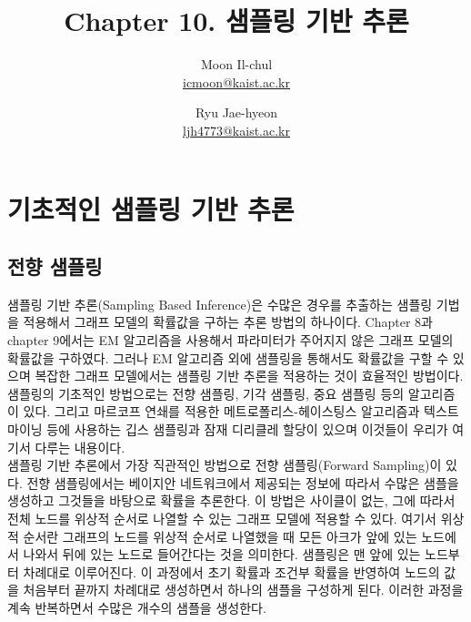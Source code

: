 \documentclass[a4paper]{oblivoir}
\author{Moon Il-chul \\ \href{mailto:icmoon@kaist.ac.kr}{icmoon@kaist.ac.kr} 
   \and Ryu Jae-hyeon
 \\ \href{mailto:ljh4773@kaist.ac.kr}{ljh4773@kaist.ac.kr} }
\title{Chapter 10. 샘플링 기반 추론}
\begin{document}
\maketitle
\tableofcontents

\section{기초적인 샘플링 기반 추론}

\subsection{전향 샘플링}

샘플링 기반 추론(Sampling Based Inference)은 수많은 경우를 추출하는 샘플링 기법을 적용해서 그래프 모델의 확률값을 구하는 추론 방법의 하나이다. Chapter 8과 chapter 9에서는 EM 알고리즘을 사용해서 파라미터가 주어지지 않은 그래프 모델의 확률값을 구하였다. 그러나 EM 알고리즘 외에 샘플링을 통해서도 확률값을 구할 수 있으며 복잡한 그래프 모델에서는 샘플링 기반 추론을 적용하는 것이 효율적인 방법이다. 샘플링의 기초적인 방법으로는 전향 샘플링, 기각 샘플링, 중요 샘플링 등의 알고리즘이 있다. 그리고 마르코프 연쇄를 적용한 메트로폴리스-헤이스팅스 알고리즘과 텍스트마이닝 등에 사용하는 깁스 샘플링과 잠재 디리클레 할당이 있으며 이것들이 우리가 여기서 다루는 내용이다. \\

샘플링 기반 추론에서 가장 직관적인 방법으로 전향 샘플링(Forward Sampling)이 있다. 전향 샘플링에서는 베이지안 네트워크에서 제공되는 정보에 따라서 수많은 샘플을 생성하고 그것들을 바탕으로 확률을 추론한다. 이 방법은 사이클이 없는, 그에 따라서 전체 노드를 위상적 순서로 나열할 수 있는 그래프 모델에 적용할 수 있다. 여기서 위상적 순서란 그래프의 노드를 위상적 순서로 나열했을 때 모든 아크가 앞에 있는 노드에서 나와서 뒤에 있는 노드로 들어간다는 것을 의미한다. 샘플링은 맨 앞에 있는 노드부터 차례대로 이루어진다. 이 과정에서 초기 확률과 조건부 확률을 반영하여 노드의 값을 처음부터 끝까지 차례대로 생성하면서 하나의 샘플을 구성하게 된다. 이러한 과정을 계속 반복하면서 수많은 개수의 샘플을 생성한다. \\
\end{document}
